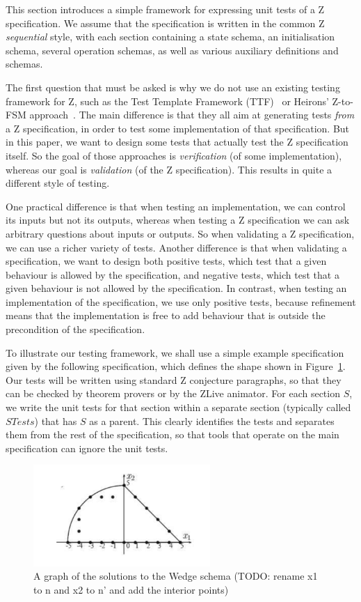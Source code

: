 \documentclass{llncs}
\begin{document}
This section introduces a simple framework for expressing unit tests
of a Z specification.  We assume that the specification is written in
the common Z \emph{sequential} style, with each section containing a
state schema, an initialisation schema, several operation schemas, as
well as various auxiliary definitions and schemas.

The first question that must be asked is why we do not use an existing
testing framework for Z, such as the Test Template Framework
(TTF)~\cite{Stocks93,carrington94} or Heirons' Z-to-FSM
approach~\cite{hierons97}.  The main difference is that they all aim at
generating tests \emph{from} a Z specification, in order to test some
implementation of that specification.  But in this paper, we want to design
some tests that actually test the Z specification itself.  So the goal of
those approaches is \emph{verification} (of some implementation), whereas
our goal is \emph{validation} (of the Z specification).  This results in
quite a different style of testing.  

One practical difference is that when testing an implementation, we can
control its 
inputs but not its outputs, whereas when testing a Z specification we can
ask arbitrary questions about inputs or outputs.  So when validating a Z
specification, we can use a richer variety of tests.  Another difference is
that when validating a specification, we want to design both positive
tests, which test that a given behaviour is allowed by the specification,
and negative tests, which test that a given behaviour is not allowed by the
specification.  In contrast, when testing an implementation of the
specification, we use only positive tests, because refinement means that
the implementation is free to add behaviour that is outside the
precondition of the specification.

To illustrate our testing framework, we shall use a simple example
specification given by the following specification, which defines the
shape shown in Figure~\ref{fig:wedge}.  Our tests will be written
using standard Z conjecture paragraphs, so that they can be checked by
theorem provers or by the ZLive animator.  For each section $S$, we
write the unit tests for that section within a separate section
(typically called $STests$) that has $S$ as a parent.  This clearly
identifies the tests and separates them from the rest of the
specification, so that tools that operate on the main specification
can ignore the unit tests.

\begin{figure}[htbp]
  \centering
  \includegraphics[width=0.6\textwidth]{wedge}
  \caption{A graph of the solutions to the Wedge schema (TODO: rename x1 to n and x2 to n' and add the interior points)}
  \label{fig:wedge}
\end{figure}
\end{document}
